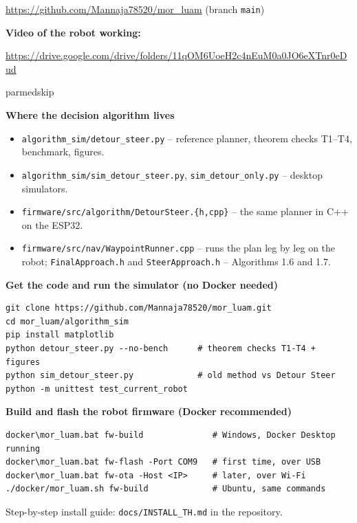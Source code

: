 \documentclass[11pt,a4paper]{article}
\begin{document}
\begin{center}
\url{https://github.com/Mannaja78520/mor_luam} \quad (branch \texttt{main})
\end{center}

\noindent\textbf{Video of the robot working:}
\begin{center}
\url{https://drive.google.com/drive/folders/11qOM6UoeH2c4nEuM0a0JO6eXTnr0eDud}
\end{center}
parmedskip

\noindent\textbf{Where the decision algorithm lives}
\begin{itemize}
\item \texttt{algorithm\_sim/detour\_steer.py} -- reference planner, theorem checks T1--T4, benchmark, figures.
\item \texttt{algorithm\_sim/sim\_detour\_steer.py}, \texttt{sim\_detour\_only.py} -- desktop simulators.
\item \texttt{firmware/src/algorithm/DetourSteer.\{h,cpp\}} -- the same planner in C++ on the ESP32.
\item \texttt{firmware/src/nav/WaypointRunner.cpp} -- runs the plan leg by leg on the robot;
\texttt{FinalApproach.h} and \texttt{SteerApproach.h} -- Algorithms 1.6 and 1.7.
\end{itemize}

\noindent\textbf{Get the code and run the simulator (no Docker needed)}
\begin{lstlisting}[numbers=none]
git clone https://github.com/Mannaja78520/mor_luam.git
cd mor_luam/algorithm_sim
pip install matplotlib
python detour_steer.py --no-bench      # theorem checks T1-T4 + figures
python sim_detour_steer.py             # old method vs Detour Steer
python -m unittest test_current_robot
\end{lstlisting}

\noindent\textbf{Build and flash the robot firmware (Docker recommended)}
\begin{lstlisting}[numbers=none]
docker\mor_luam.bat fw-build              # Windows, Docker Desktop running
docker\mor_luam.bat fw-flash -Port COM9   # first time, over USB
docker\mor_luam.bat fw-ota -Host <IP>     # later, over Wi-Fi
./docker/mor_luam.sh fw-build             # Ubuntu, same commands
\end{lstlisting}
Step-by-step install guide: \texttt{docs/INSTALL\_TH.md} in the repository.
\end{document}
